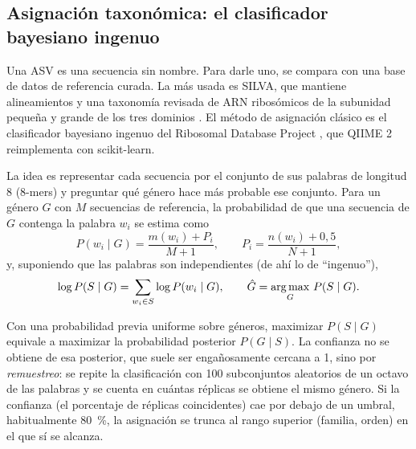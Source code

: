 \subsection{Asignación taxonómica: el clasificador bayesiano ingenuo}

Una ASV es una secuencia sin nombre. Para darle uno, se compara con una base de datos de referencia curada. La más usada es SILVA, que mantiene alineamientos y una taxonomía revisada de ARN ribosómicos de la subunidad pequeña y grande de los tres dominios \parencite{c14-quast2013}. El método de asignación clásico es el clasificador bayesiano ingenuo del Ribosomal Database Project \parencite{c14-wang2007}, que QIIME 2 reimplementa con scikit-learn.

La idea es representar cada secuencia por el conjunto de sus palabras de longitud 8 (8-mers) y preguntar qué género hace más probable ese conjunto. Para un género $G$ con $M$ secuencias de referencia, la probabilidad de que una secuencia de $G$ contenga la palabra $w_i$ se estima como
\begin{equation}\label{eq:14-bayes-w}
P(w_i\mid G) = \frac{m(w_i) + P_i}{M + 1}, \qquad P_i = \frac{n(w_i) + 0{,}5}{N + 1},
\end{equation}
y, suponiendo que las palabras son independientes (de ahí lo de ``ingenuo''),
\begin{equation}\label{eq:14-bayes}
\log P(S\mid G) = \sum_{w_i \in S} \log P(w_i\mid G), \qquad \hat{G} = \operatorname*{arg\,max}_G\, P(S\mid G).
\end{equation}

\begin{simbolos}
\end{simbolos}

Con una probabilidad previa uniforme sobre géneros, maximizar $P(S\mid G)$ equivale a maximizar la probabilidad posterior $P(G\mid S)$. La confianza no se obtiene de esa posterior, que suele ser engañosamente cercana a 1, sino por \emph{remuestreo}: se repite la clasificación con 100 subconjuntos aleatorios de un octavo de las palabras y se cuenta en cuántas réplicas se obtiene el mismo género. Si la confianza (el porcentaje de réplicas coincidentes) cae por debajo de un umbral, habitualmente \SI{80}{\percent}, la asignación se trunca al rango superior (familia, orden) en el que sí se alcanza.

